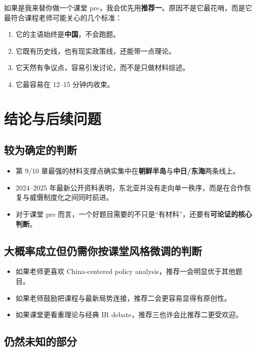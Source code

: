 \documentclass[a4paper]{article}
\begin{document}
如果是我来替你做一个课堂 pre，我会优先用\textbf{推荐一}。原因不是它最花哨，而是它最符合课程老师可能关心的几个标准：

\begin{enumerate}
\item 它的主语始终是\textbf{中国}，不会跑题。
\item 它既有历史线，也有现实政策线，还能带一点理论。
\item 它天然有争议点，容易引发讨论，而不是只做材料综述。
\item 它最容易在 12--15 分钟内收束。
\end{enumerate}

\section{结论与后续问题}

\subsection{较为确定的判断}

\begin{itemize}
\item 第 9/10 章最强的材料支撑点确实集中在\textbf{朝鲜半岛}与\textbf{中日/东海}两条线上。
\item 2024--2025 年最新公开资料表明，东北亚并没有走向单一秩序，而是在合作恢复与威慑制度化之间同时前进。
\item 对于课堂 pre 而言，一个好题目需要的不只是``有材料''，还要有\textbf{可论证的核心判断}。
\end{itemize}

\subsection{大概率成立但仍需你按课堂风格微调的判断}

\begin{itemize}
\item 如果老师更喜欢 China-centered policy analysis，推荐一会明显优于其他题目。
\item 如果老师鼓励把课程与最新局势连接，推荐二会更容易显得有原创性。
\item 如果课堂更看重理论与经典 IR debate，推荐三也许会比推荐二更受欢迎。
\end{itemize}

\subsection{仍然未知的部分}
\end{document}
